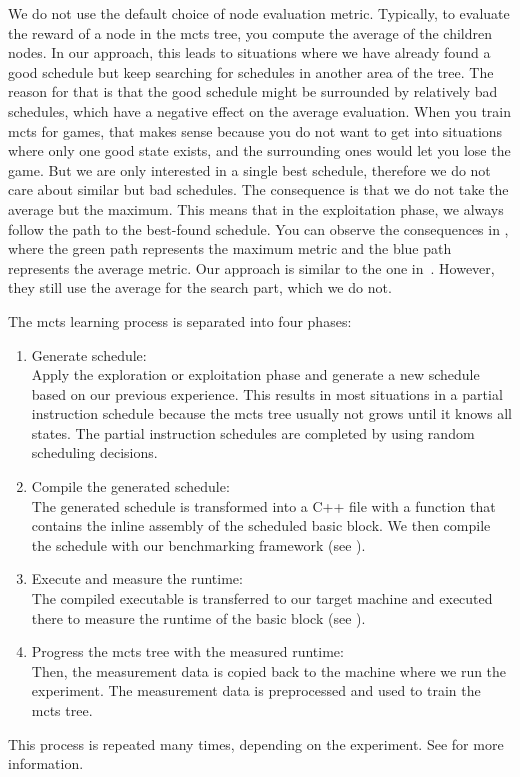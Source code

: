 We do not use the default choice of node evaluation metric.
Typically, to evaluate the reward of a node in the \ac{mcts} tree, you compute the average of the children nodes.
In our approach, this leads to situations where we have already found a good schedule but keep searching for schedules in another area of the tree.
The reason for that is that the good schedule might be surrounded by relatively bad schedules, which have a negative effect on the average evaluation.
When you train \ac{mcts} for games, that makes sense because you do not want to get into situations where only one good state exists, and the surrounding ones would let you lose the game.
But we are only interested in a single best schedule, therefore we do not care about similar but bad schedules.
The consequence is that we do not take the average but the maximum.
This means that in the exploitation phase, we always follow the path to the best-found schedule.
You can observe the consequences in , where the green path represents the maximum metric and the blue path represents the average metric.
Our approach is similar to the one in~\cite{bjornsson2009cadiaplayer}.
However, they still use the average for the search part, which we do not.

The \ac{mcts} learning process is separated into four phases:
\begin{enumerate}
    \item Generate schedule: \\
    Apply the exploration or exploitation phase and generate a new schedule based on our previous experience.
    This results in most situations in a partial instruction schedule because the \ac{mcts} tree usually not grows until it knows all states.
    The partial instruction schedules are completed by using random scheduling decisions. 
    \item Compile the generated schedule: \\
    The generated schedule is transformed into a C++ file with a function that contains the inline assembly of the scheduled basic block.
    We then compile the schedule with our benchmarking framework (see ).
    \item Execute and measure the runtime: \\
    The compiled executable is transferred to our target machine and executed there to measure the runtime of the basic block (see ).
    \item Progress the \ac{mcts} tree with the measured runtime: \\
    Then, the measurement data is copied back to the machine where we run the experiment.
    The measurement data is preprocessed and used to train the \ac{mcts} tree.
\end{enumerate}
This process is repeated many times, depending on the experiment.
See  for more information.

